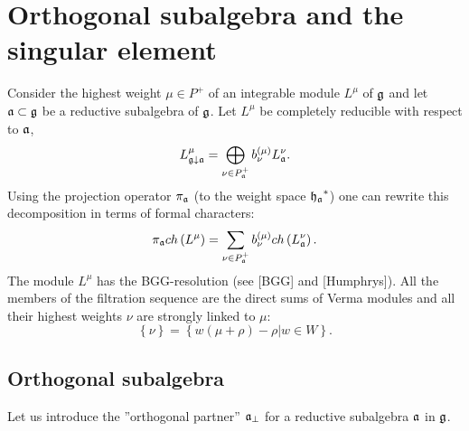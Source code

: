 \documentclass[12pt]{article}
\theoremstyle{definition}
\begin{document}
\section{Orthogonal subalgebra and the singular element}

\label{sec:recurr-form-branch}

Consider the highest weight $\mu \in P^{+}$ of an integrable module $L^{\mu
} $ of $\frak{g}$ and let $\frak{a}\subset \frak{g}$ be a reductive
subalgebra of $\frak{g}$. Let $L^{\mu }$ be completely reducible with
respect to $\frak{a}$, 
\[
L_{\frak{g}\downarrow \frak{a}}^{\mu }=\bigoplus\limits_{\nu \in P_{\frak{a}%
}^{+}}b_{\nu }^{\left( \mu \right) }L_{\frak{a}}^{\nu }. 
\]
Using the projection operator $\pi _{\frak{a}}$ (to the weight space $\frak{%
h_{a}}^{\ast }$) one can rewrite this decomposition in terms of formal
characters: 
\begin{equation}
\pi _{\frak{a}}ch\left( L^{\mu }\right) =\sum_{\nu \in P_{\frak{a}%
}^{+}}b_{\nu }^{(\mu )}ch\left( L_{\frak{a}}^{\nu }\right) .
\label{branching1}
\end{equation}
The module $L^{\mu }$ has the BGG-resolution (see [BGG] and [Humphrys]). All
the members of the filtration sequence are the direct sums of Verma modules
and all their highest weights $\nu $ are strongly linked to $\mu $: 
\[
\left\{ \nu \right\} =\left\{ w\left( \mu +\rho \right) -\rho |w\in
W\right\} . 
\]

\subsection{Orthogonal subalgebra}

Let us introduce the ''orthogonal partner'' $\frak{a}_{\bot }$ for a
reductive subalgebra $\frak{a}$ in $\frak{g}$.
\end{document}
